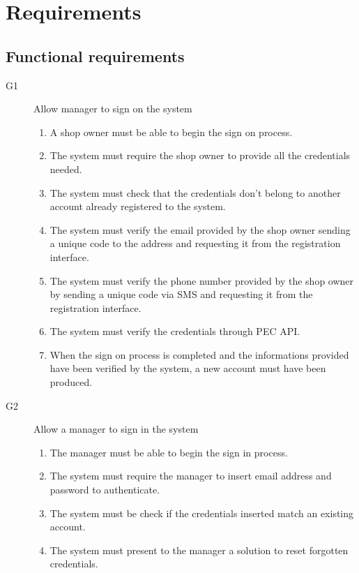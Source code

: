 \section{Requirements}
\label{sect:Specificrequirements}

\subsection{Functional requirements}
\label{subsect:functionalrequirements}

\begin{description}
    \item [G1] Allow manager to sign on the system
        \begin{enumerate}[label=\textbf{R\arabic*}]
            \item A shop owner must be able to begin the sign on process.
            \item The system must require the shop owner to provide all the credentials needed.
            \item The system must check that the credentials don't belong to another account already registered to the system.
            \item The system must verify the email provided by the shop owner sending a unique code to the address and requesting it from the registration interface.
            \item The system must verify the phone number provided by the shop owner by sending a unique code via SMS and requesting it from the registration interface.
            \item The system must verify the credentials through PEC API.
            \item When the sign on process is completed and the informations provided have been verified by the system, a new account must have been produced.
        \end{enumerate}
    \item [G2] Allow a manager to sign in the system
        \begin{enumerate}[resume*]
            \item The manager must be able to begin the sign in process.
            \item The system must require the manager to insert email address and password to authenticate.
            \item The system must be check if the credentials inserted match an existing account.
            \item The system must present to the manager a solution to reset forgotten credentials.

\end{enumerate}
\end{description}
